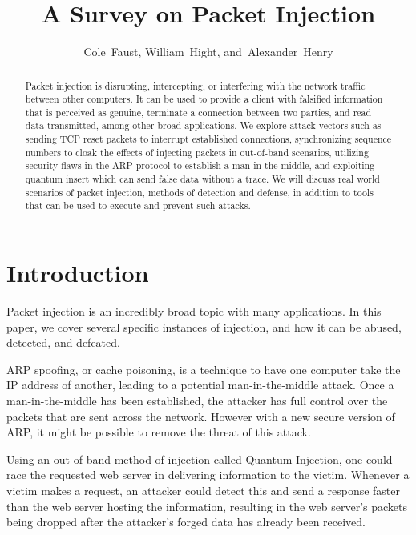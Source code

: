 \documentclass[journal]{IEEEtran}
\begin{document}
\title{A Survey on Packet Injection}

\author{Cole~Faust, William~Hight, and~Alexander~Henry}

\maketitle


\begin{abstract}
Packet injection is disrupting, intercepting, or interfering with the network traffic between other computers. It can be used to provide a client with falsified information that is perceived as genuine, terminate a connection between two parties, and read data transmitted, among other broad applications. We explore attack vectors such as sending TCP reset packets to interrupt established connections, synchronizing sequence numbers to cloak the effects of injecting packets in out-of-band scenarios, utilizing security flaws in the ARP protocol to establish a man-in-the-middle, and exploiting quantum insert which can send false data without a trace. We will discuss real world scenarios of packet injection, methods of detection and defense, in addition to tools that can be used to execute and prevent such attacks.
\end{abstract}

\section{Introduction}

Packet injection is an incredibly broad topic with many applications. In this paper, we cover several specific instances of injection, and how it can be abused, detected, and defeated.
	
ARP spoofing, or cache poisoning, is a technique to have one computer take the IP address of another, leading to a potential man-in-the-middle attack. Once a man-in-the-middle has been established, the attacker has full control over the packets that are sent across the network. However with a new secure version of ARP, it might be possible to remove the threat of this attack.

Using an out-of-band method of injection called Quantum Injection, one could race the requested web server in delivering information to the victim. Whenever a victim makes a request, an attacker could detect this and send a response faster than the web server hosting the information, resulting in the web server's packets being dropped after the attacker's forged data has already been received.
\end{document}
